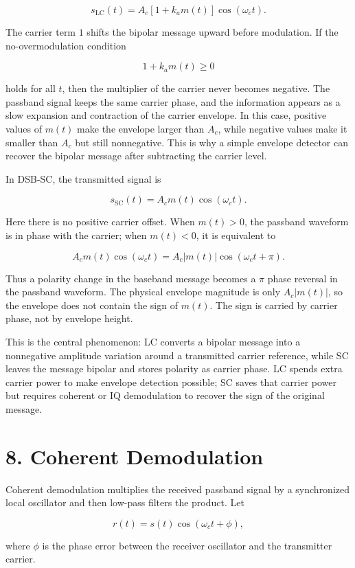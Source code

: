 \documentclass[11pt]{article}
\begin{document}
\[
s_{\mathrm{LC}}(t)=A_c\left[1+k_a m(t)\right]\cos(\omega_c t).
\]

The carrier term $1$ shifts the bipolar message upward before modulation. If the no-overmodulation condition

\[
1+k_a m(t)\geq 0
\]

holds for all $t$, then the multiplier of the carrier never becomes negative. The passband signal keeps the same carrier phase, and the information appears as a slow expansion and contraction of the carrier envelope. In this case, positive values of $m(t)$ make the envelope larger than $A_c$, while negative values make it smaller than $A_c$ but still nonnegative. This is why a simple envelope detector can recover the bipolar message after subtracting the carrier level.

In DSB-SC, the transmitted signal is

\[
s_{\mathrm{SC}}(t)=A_c m(t)\cos(\omega_c t).
\]

Here there is no positive carrier offset. When $m(t)>0$, the passband waveform is in phase with the carrier; when $m(t)<0$, it is equivalent to

\[
A_c m(t)\cos(\omega_c t)=A_c\lvert m(t)\rvert\cos(\omega_c t+\pi).
\]

Thus a polarity change in the baseband message becomes a $\pi$ phase reversal in the passband waveform. The physical envelope magnitude is only $A_c\lvert m(t)\rvert$, so the envelope does not contain the sign of $m(t)$. The sign is carried by carrier phase, not by envelope height.

This is the central phenomenon: LC converts a bipolar message into a nonnegative amplitude variation around a transmitted carrier reference, while SC leaves the message bipolar and stores polarity as carrier phase. LC spends extra carrier power to make envelope detection possible; SC saves that carrier power but requires coherent or IQ demodulation to recover the sign of the original message.

\section{8. Coherent Demodulation}

Coherent demodulation multiplies the received passband signal by a synchronized local oscillator and then low-pass filters the product. Let

\[
r(t)=s(t)\cos(\omega_c t+\phi),
\]

where $\phi$ is the phase error between the receiver oscillator and the transmitter carrier.
\end{document}
